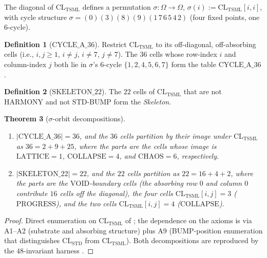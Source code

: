 \documentclass[11pt,reqno]{amsart}
\theoremstyle{plain}
\newtheorem{theorem}{Theorem}[section]
\theoremstyle{definition}
\newtheorem{definition}[theorem]{Definition}
\theoremstyle{remark}
\newcommand{\TSML}{\mathrm{TSML}}
\newcommand{\STD}{\mathrm{STD}}
\begin{document}
The diagonal of $\mathrm{CL}_\TSML$ defines a permutation
$\sigma : \Omega \to \Omega$, $\sigma(i) := \mathrm{CL}_\TSML[i,i]$,
with cycle structure $\sigma = (0)(3)(8)(9)(1\,7\,6\,5\,4\,2)$
(four fixed points, one $6$-cycle).

\begin{definition}[$\mathrm{CYCLE\_A\_36}$]\label{def:cyclea36}
Restrict $\mathrm{CL}_\TSML$ to its off-diagonal, off-absorbing
cells (i.e., $i,j\ge 1$, $i\neq j$, $i\ne 7$, $j\ne 7$). The $36$
cells whose row-index $i$ and column-index $j$ both lie in
$\sigma$'s $6$-cycle $\{1,2,4,5,6,7\}$ form the table
$\mathrm{CYCLE\_A\_36}$.
\end{definition}

\begin{definition}[$\mathrm{SKELETON\_22}$]\label{def:skeleton22}
The $22$ cells of $\mathrm{CL}_\TSML$ that are not HARMONY and not
$\STD$-BUMP form the \emph{Skeleton}.
\end{definition}

\begin{theorem}[$\sigma$-orbit decompositions]\label{thm:cs}
\begin{enumerate}[label={\rm(\arabic*)}]
\item $|\mathrm{CYCLE\_A\_36}| = 36$, and the $36$ cells partition
by their image under $\mathrm{CL}_\TSML$ as
$36 = 2 + 9 + 25$, where the parts are the cells whose image is
$\mathrm{LATTICE}=1$, $\mathrm{COLLAPSE}=4$, and $\mathrm{CHAOS}=6$,
respectively.
\item $|\mathrm{SKELETON\_22}| = 22$, and the $22$ cells partition as
$22 = 16 + 4 + 2$, where the parts are the $\mathrm{VOID}$-boundary
cells (the absorbing row $0$ and column $0$ contribute $16$
cells off the diagonal), the four cells $\mathrm{CL}_\TSML[i,j]=3$
($\mathrm{PROGRESS}$), and the two cells $\mathrm{CL}_\TSML[i,j]=4$
($\mathrm{COLLAPSE}$).
\end{enumerate}
\end{theorem}

\begin{proof}
Direct enumeration on $\mathrm{CL}_\TSML$ of
\cite[\S2]{SandersForcing}; the dependence on the axioms is via
A1--A2 (substrate and absorbing structure) plus A9 (BUMP-position
enumeration that distinguishes $\mathrm{CL}_\STD$ from
$\mathrm{CL}_\TSML$). Both decompositions are reproduced by the
$48$-invariant harness \cite{FoundationsModule}.
\end{proof}

\end{document}
